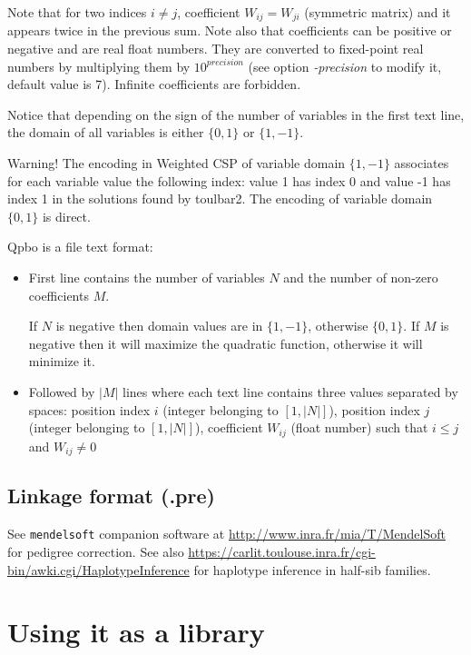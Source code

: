 \documentclass{article}
\begin{document}
Note that for two indices $i \neq j$, coefficient $W_{ij} = W_{ji}$ (symmetric matrix) and it appears twice in the previous sum. Note also that coefficients can be positive or negative and are real float numbers. They are converted to fixed-point real numbers by multiplying them by $10^{precision}$ (see option {\em -precision} to modify it, default value is 7).  Infinite coefficients are forbidden.

Notice that depending on the sign of the number of variables in the first text line, the domain of all variables is either $\{0,1\}$ or $\{1,-1\}$.

Warning! The encoding in Weighted CSP of variable domain $\{1,-1\}$ associates for each variable value the following index: value 1 has index 0 and value -1 has index 1 in the solutions found by toulbar2.
The encoding  of variable domain $\{0,1\}$ is direct.

Qpbo is a file text format:
\begin{itemize}
\item First line contains the number of variables $N$ and the number of non-zero coefficients $M$.

If $N$ is negative then domain values are in $\{1, -1\}$, otherwise $\{0, 1\}$.
If $M$ is negative then it will maximize the quadratic function, otherwise it will minimize it.

\item Followed by $|M|$ lines where each text line contains three values separated by spaces:
position index $i$ (integer belonging to $[1,|N|]$),
position index $j$ (integer belonging to $[1,|N|]$),
coefficient $W_{ij}$ (float number)
such that $i \leq j$ and $W_{ij} \neq 0$
\end{itemize}

\subsection{Linkage format (.pre)}

See \texttt{mendelsoft} companion software at \url{http://www.inra.fr/mia/T/MendelSoft} for pedigree correction. See also \url{https://carlit.toulouse.inra.fr/cgi-bin/awki.cgi/HaplotypeInference} for haplotype inference in half-sib families.


\section{Using it as a library}
\end{document}
